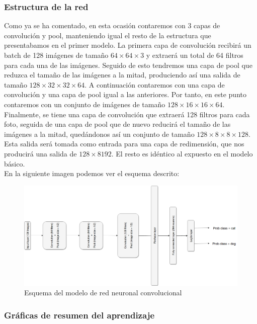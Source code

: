 \documentclass[11pt]{article}
\theoremstyle{plain}
\theoremstyle{definition}
\begin{document}
\subsubsection{Estructura de la red}

Como ya se ha comentado, en esta ocasión contaremos con 3 capas de
convolución y pool, manteniendo igual el resto de la estructura que
presentabamos en el primer modelo. La primera capa de convolución
recibirá un batch de 128 imágenes de tamaño $64 \times 64 \times 3$ y
extraerá un total de 64 filtros para cada una de las imágenes. Seguido
de esto tendremos una capa de pool que reduzca el tamaño de las
imágenes a la mitad, produciendo así una salida de tamaño
$128 \times 32 \times 32 \times 64$.  A continuación contaremos con
una capa de convolución y una capa de pool igual a las anteriores. Por
tanto, en este punto contaremos con un conjunto de imágenes de tamaño
$128 \times 16 \times 16 \times 64$. Finalmente, se tiene una capa de
convolución que extraerá 128 filtros para cada foto, seguida de una
capa de pool que de nuevo reducirá el tamaño de las imágenes a la
mitad, quedándonos así un conjunto de tamaño
$128 \times 8 \times 8 \times 128$. Esta salida será tomada como
entrada para una capa de redimensión, que nos producirá una salida de
$128 \times 8192$. El resto es idéntico al expuesto en el modelo
básico.\\

En la siguiente imagen podemos ver el esquema descrito:

\begin{figure}[H]
  \centering \includegraphics[width=1\textwidth]{imgs/adam_model.png}
  \caption{Esquema del modelo de red neuronal convolucional}
\end{figure}

\subsubsection{Gráficas de resumen del aprendizaje}
\end{document}
